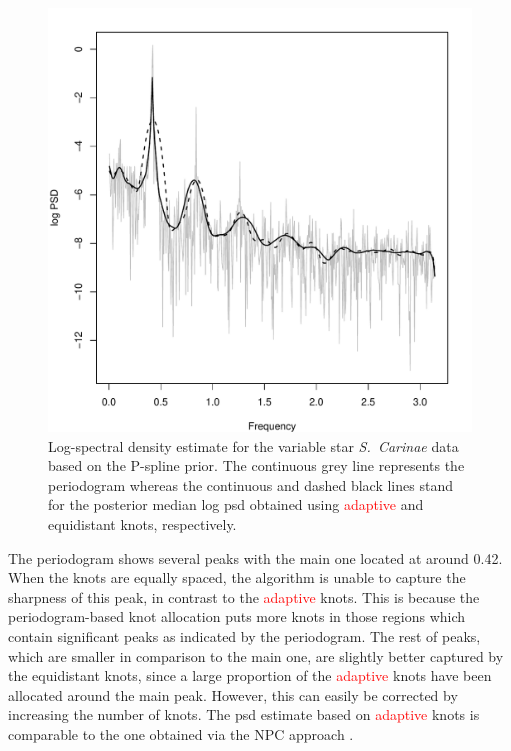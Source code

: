 \documentclass[twocolumn,final]{svjour3}
\begin{document}
\begin{figure}[]
	\centering
	\includegraphics[scale=0.4,clip=true,angle=0]{carinae.pdf}
	\caption{Log-spectral density estimate for the variable star {\it S.\ Carinae} data based on the P-spline prior. The continuous grey line represents the periodogram whereas the continuous and dashed black lines stand for the posterior median log psd obtained using \textcolor{red}{adaptive} and equidistant knots, respectively.}
	\label{fig:carinae}
\end{figure}

The periodogram shows several peaks with the main one located at around 0.42.  When the knots are equally spaced, the algorithm is unable to capture the sharpness of this peak,
in contrast to the \textcolor{red}{adaptive} knots.  This is because the periodogram-based knot allocation puts more knots in those regions which contain significant peaks as indicated by the periodogram.  The rest of peaks, which are smaller in comparison to the main one, are slightly better captured by the equidistant knots, since a large proportion of the \textcolor{red}{adaptive} knots have been allocated around the main peak. However, this can easily  be corrected by increasing the number of knots.  The psd estimate based on \textcolor{red}{adaptive} knots is comparable to the one obtained via the NPC approach \citep{Kirch:2018}.
\end{document}
